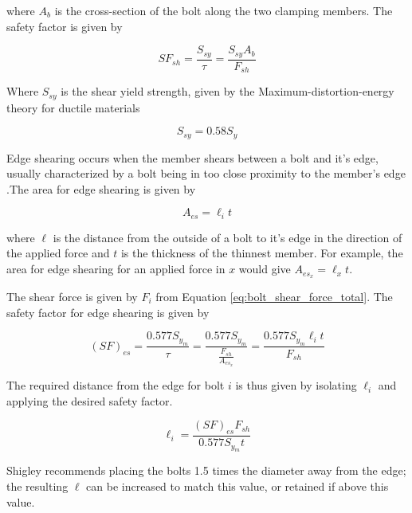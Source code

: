 where $A_b$ is the cross-section of the bolt along the two clamping members.
The safety factor is given by

\begin{equation} \label{eq:(SF)_bolt}
    {SF}_{sh} = \frac{S_{sy}}{\tau} = \frac{S_{sy} A_b}{F_{sh}}
\end{equation}{}

Where $S_{sy}$ is the shear yield strength, given by the Maximum-distortion-energy theory for ductile materials \cite{juvinall_fundamentals_2012}

\begin{equation} \label{eq:shear_yield_strength}
    S_{sy} = 0.58 S_y
\end{equation}{}


Edge shearing occurs when the member shears between a bolt and it's edge, usually characterized by a bolt being in too close proximity to the member's edge \cite{juvinall_fundamentals_2012}.The area for edge shearing is given by

\begin{equation}
    A_{es} = \ell_i t
\end{equation}{}

where $\ell$ is the distance from the outside of a bolt to it's edge in the direction of the applied force and $t$ is the thickness of the thinnest member.
For example, the area for edge shearing for an applied force in $x$ would give $A_{es_x} = \ell_x t$.

The shear force is given by $F_i$ from Equation \ref{eq:bolt_shear_force_total}.
The safety factor for edge shearing is given by

\begin{equation}
    (SF)_{es} = \frac{0.577 S_{y_m}}{\tau} = \frac{0.577 S_{y_m}}{\frac{F_{sh}}{A_{es_x}}} = \frac{0.577 S_{y_m} \ell_i t}{F_{sh}}
\end{equation}{}

The required distance from the edge for bolt $i$ is thus given by isolating $\ell_i$ and applying the desired safety factor.

\begin{equation} \label{eq:bolt_edge_shearing_distance}
    \ell_i = \frac{(SF)_{es} F_{sh}}{0.577 S_{y_m} t}
\end{equation}{}

Shigley recommends placing the bolts 1.5 times the diameter away from the edge; the resulting $\ell$ can be increased to match this value, or retained if above this value.\\


